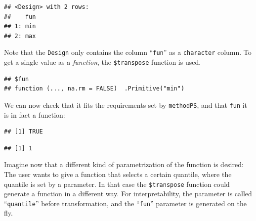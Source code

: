 \documentclass[]{scrbook}
\newenvironment{Shaded}{\begin{snugshade}}{\end{snugshade}}
\newcommand{\DecValTok}[1]{\textcolor[rgb]{0.00,0.00,0.81}{#1}}
\newcommand{\KeywordTok}[1]{\textcolor[rgb]{0.13,0.29,0.53}{\textbf{#1}}}
\newcommand{\NormalTok}[1]{#1}
\newcommand{\OperatorTok}[1]{\textcolor[rgb]{0.81,0.36,0.00}{\textbf{#1}}}
\newcommand{\StringTok}[1]{\textcolor[rgb]{0.31,0.60,0.02}{#1}}
\renewenvironment{Shaded} {\begin{snugshade}\small} {\end{snugshade}}
\begin{document}
\begin{verbatim}
## <Design> with 2 rows:
##    fun
## 1: min
## 2: max
\end{verbatim}

Note that the \texttt{Design} only contains the column ``\texttt{fun}'' as a \texttt{character} column.
To get a single value as a \emph{function}, the \texttt{\$transpose} function is used.

\begin{Shaded}
\end{Shaded}

\begin{verbatim}
## $fun
## function (..., na.rm = FALSE)  .Primitive("min")
\end{verbatim}

We can now check that it fits the requirements set by \texttt{methodPS}, and that \texttt{fun} it is in fact a function:

\begin{Shaded}
\end{Shaded}

\begin{verbatim}
## [1] TRUE
\end{verbatim}

\begin{Shaded}
\end{Shaded}

\begin{verbatim}
## [1] 1
\end{verbatim}

Imagine now that a different kind of parametrization of the function is desired:
The user wants to give a function that selects a certain quantile, where the quantile is set by a parameter.
In that case the \texttt{\$transpose} function could generate a function in a different way.
For interpretability, the parameter is called ``\texttt{quantile}'' before transformation, and the ``\texttt{fun}'' parameter is generated on the fly.
\end{document}
